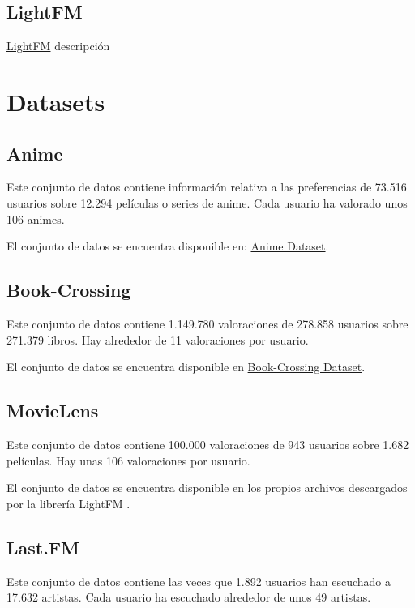 \subsection{LightFM}\label{lightfm}
\href{https://github.com/lyst/lightfm}{LightFM} descripción

\section{Datasets}\label{datasets}
\subsection{Anime}\label{anime}
Este conjunto de datos \cite{CopperUnion2017} contiene información relativa a las preferencias de 73.516 usuarios sobre 12.294 películas o series de anime. Cada usuario ha valorado unos 106 animes.

El conjunto de datos se encuentra disponible en: \href{https://www.kaggle.com/CooperUnion/anime-recommendations-database/downloads/anime-recommendations-database.zip/1}{Anime Dataset}.

\subsection{Book-Crossing}\label{book-crossing}
Este conjunto de datos \cite{Ziegler2004} contiene 1.149.780 valoraciones de 278.858 usuarios sobre 271.379 libros. Hay alrededor de 11 valoraciones por usuario.

El conjunto de datos se encuentra disponible en \href{http://www2.informatik.uni-freiburg.de/~cziegler/BX/BX-CSV-Dump.zip}{Book-Crossing Dataset}.

\subsection{MovieLens}\label{movielens}
Este conjunto de datos \cite{GroupLens1998} contiene 100.000 valoraciones de 943 usuarios sobre 1.682 películas. Hay unas 106 valoraciones por usuario.

El conjunto de datos se encuentra disponible en los propios archivos descargados por la librería LightFM \cite{DBLP:conf/recsys/Kula15}.

\subsection{Last.FM}\label{last.fm}
Este conjunto de datos \cite{Cantador:RecSys2011} contiene las veces que 1.892 usuarios han escuchado a 17.632 artistas. Cada usuario ha escuchado alrededor de unos 49 artistas.


